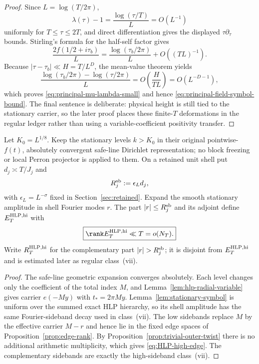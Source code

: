 \begin{proof}
Since $L=\log(T/2\pi)$,
\[
\lambda(\tau)-1=\frac{\log(\tau/T)}L=O(L^{-1})
\]
uniformly for $T\le\tau\le2T$, and direct differentiation gives the displayed
$\tau\partial_\tau$ bounds.  Stirling's formula for the half-self factor gives
\[
\frac{2f(1/2+i\tau_b)}L
=\frac{\log(\tau_b/2\pi)}L+O((TL)^{-1}).
\]
Because $|\tau-\tau_b|\ll H=T/L^D$, the mean-value theorem yields
\[
\frac{\log(\tau_b/2\pi)-\log(\tau/2\pi)}L
=O\!\left(\frac{H}{TL}\right)=O(L^{-D-1}),
\]
which proves \eqref{eq:principal-mu-lambda-small} and hence
\eqref{eq:principal-field-symbol-bound}.  The final sentence is deliberate:
physical height is still tied to the stationary carrier, so the later proof
places these finite-$T$ deformations in the regular ledger rather than using a
variable-coefficient positivity transfer.
\end{proof}

\begin{lemma}
\label{lem:HLP-high-edge}
Let $K_0=L^{1/8}$. Keep the stationary levels $k>K_0$ in their original
pointwise-$f(t)$, absolutely convergent safe-line Dirichlet representation; no
block freezing or local Perron projector is applied to them. On a retained unit shell put
$d_j\asymp T/J_j$ and
\[
R_j^{\rm sb}:=\epsilon_Ld_j,
\]
with $\epsilon_L=L^{-\sigma}$ fixed in Section~\ref{sec:retained}. Expand the
smooth stationary amplitude in shell Fourier modes $r$. The part
$|r|\le R_j^{\rm sb}$ and its adjoint define $E_T^{\rm HLP,hi}$ with
\begin{equation}
\boxed{
\rank E_T^{\rm HLP,hi}\ll T=o(N_T).
}
\label{eq:HLP-high-edge}
\end{equation}
Write $R_T^{\rm HLP,hi}$ for the complementary part
$|r|>R_j^{\rm sb}$; it is disjoint from $E_T^{\rm HLP,hi}$ and is estimated
later as regular class~(vii).
\end{lemma}

\begin{proof}
The safe-line geometric expansion converges absolutely. Each level changes only
the coefficient of the total index $M$, and
Lemma~\ref{lem:hlp-radial-variable} gives carrier $e(-My)$ with
$t_*=2\pi My$. Lemma~\ref{lem:stationary-symbol} is uniform over the summed
exact HLP hierarchy, so its shell amplitude has the same Fourier-sideband decay
used in class~(vii). The low sidebands replace $M$ by the effective carrier
$M-r$ and hence lie in the fixed edge spaces of
Proposition~\ref{prop:edge-rank}. By Proposition~\ref{prop:trivial-outer-twist}
there is no additional arithmetic multiplicity, which gives
\eqref{eq:HLP-high-edge}. The complementary sidebands are exactly the
high-sideband class~(vii).
\end{proof}

